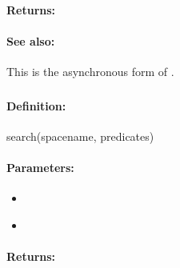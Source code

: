 \paragraph{Returns:}


\paragraph{See also:}  This is the asynchronous form of .

\pagebreak
\subsubsection{}
\label{api:ruby:search}


\paragraph{Definition:}
\begin{rubycode}
search(spacename, predicates)
\end{rubycode}

\paragraph{Parameters:}
\begin{itemize}[noitemsep]
\item {}\\

\item {}\\

\end{itemize}

\paragraph{Returns:}


\pagebreak
\subsubsection{}
\label{api:ruby:search_describe}


